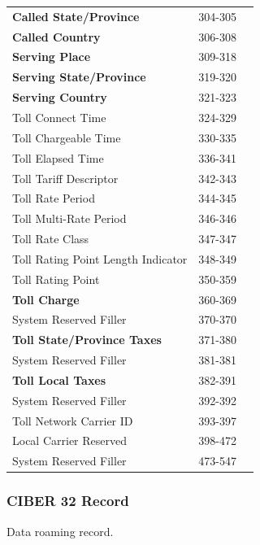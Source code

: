 \documentclass[12pt,twoside]{article}
\begin{document}
\begin{longtable}{l|l|l}
\textbf{Called State/Province} & 304-305 & \\
\textbf{Called Country} & 306-308 & \\
\textbf{Serving Place} & 309-318 & \\
\textbf{Serving State/Province} & 319-320 & \\
\textbf{Serving Country} & 321-323 & \\
Toll Connect Time & 324-329 & \\
Toll Chargeable Time & 330-335 & \\
Toll Elapsed Time & 336-341 & \\
Toll Tariff Descriptor & 342-343 & \\
Toll Rate Period & 344-345 & \\
Toll Multi-Rate Period & 346-346 & \\
Toll Rate Class & 347-347 & \\
Toll Rating Point Length Indicator & 348-349 & \\
Toll Rating Point & 350-359 & \\
\textbf{Toll Charge} & 360-369 & \\
System Reserved Filler & 370-370 & \\
\textbf{Toll State/Province Taxes} & 371-380 & \\
System Reserved Filler & 381-381 & \\
\textbf{Toll Local Taxes} & 382-391 & \\
System Reserved Filler & 392-392 & \\
Toll Network Carrier ID & 393-397 & \\
Local Carrier Reserved & 398-472 & \\
System Reserved Filler & 473-547 & \\
\hline
\end{longtable}
\normalsize
\subsubsection{CIBER 32 Record}
\label{sec:orgheadline21}
Data roaming record.
\footnotesize
\end{document}
